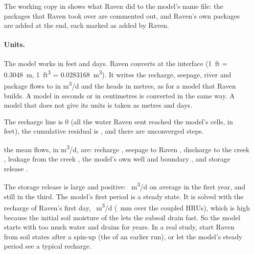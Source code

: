 The working copy in  shows what Raven did to the model's name file:
\why the packages that Raven took over are commented out, and Raven's own packages are added at the end, each marked as
added by Raven.

\paragraph{Units.} The model works in feet and days. Raven converts at the interface (1~ft = 0.3048~m,
1~ft\textsuperscript{3} = 0.0283168~m\textsuperscript{3}). It writes the recharge, seepage, river and package flows to
 in m\textsuperscript{3}/d and the heads in metres, as for a model that Raven builds. A model in seconds
or in centimetres is converted in the same way. A model that does not give its units is taken as metres and days.

\begin{tocheck}
The recharge line is 0 (all the water Raven sent reached the model's cells, in feet), the cumulative residual is
, and there are  unconverged steps.
\end{tocheck}
\why the mean flows, in m\textsuperscript{3}/d, are: recharge , seepage to Raven , discharge to
the creek , leakage from the creek , the model's own well and boundary , and
storage release .
\begin{note}
The storage release is large and positive: ~m\textsuperscript{3}/d on average in the first year, and still
 in the third. The model's first period is a steady state. It is solved with the recharge of Raven's first
day, ~m\textsuperscript{3}/d (~mm over the coupled HRUs), which is high because the
initial soil moisture of the  lets the subsoil drain fast. So the model starts with too much water and drains for
years. In a real study, start Raven from soil states after a spin-up (the  of an earlier run), or let the
model's steady period see a typical recharge.
\end{note}
